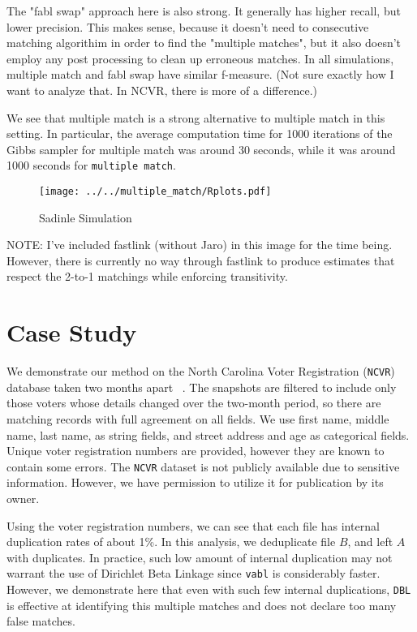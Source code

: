 \documentclass[12pt,letterpaper]{article}
\newcommand{\1}[1]{\mathbb{I}\!\left[#1\right]} %
\begin{document}
The "fabl swap" approach here is also strong. It generally has higher recall, but lower precision. This makes sense, because it doesn't need to consecutive matching algorithim in order to find the "multiple matches", but it also doesn't employ any post processing to clean up erroneous matches. In all simulations, multiple match and fabl swap have similar f-measure. (Not sure exactly how I want to analyze that. In NCVR, there is more of a difference.) 

We see that multiple match is a strong alternative to multiple match in this setting. In particular, the average computation time for 1000 iterations of the Gibbs sampler for multiple match was around 30 seconds, while it was around 1000 seconds for \texttt{multiple match}. 

\begin{figure}[t]
	\centering
	\texttt{[image: ../../multiple\_match/Rplots.pdf]}
	\caption{Sadinle Simulation}
	\label{fig:sadinle}
\end{figure}


NOTE: I've included fastlink (without Jaro) in this image for the time being. However, there is currently no way through fastlink to produce estimates that respect the 2-to-1 matchings while enforcing transitivity. 

\section{Case Study}

We demonstrate our method on the North Carolina Voter Registration (\texttt{NCVR}) database taken two months apart ~\citep{christen_preparation_2014}. The snapshots are filtered to include only those voters whose details changed over the two-month period, so there are matching records with full agreement on all fields. We use first name, middle name, last name, as string fields, and street address and age as categorical fields. Unique voter registration numbers are provided, however they are known to contain some errors. The \texttt{NCVR} dataset is not publicly available due to sensitive information. However, we have permission to utilize it for publication by its owner.

Using the voter registration numbers, we can see that each file has internal duplication rates of about 1\%. In this analysis, we deduplicate file $B$, and left $A$ with duplicates. In practice, such low amount of internal duplication may not warrant the use of Dirichlet Beta Linkage since \texttt{vabl} is considerably faster. However, we demonstrate here that even with such few internal duplications, \texttt{DBL} is effective at identifying this multiple matches and does not declare too many false matches. 
\end{document}
